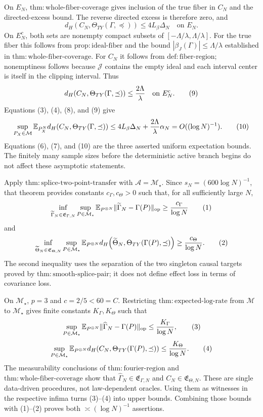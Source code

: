 On \(E_N\), \(\mathrm{thm:whole\text{-}fiber\text{-}coverage}\) gives inclusion of the true fiber in \(C_N\) and the directed-excess bound.  The reverse directed excess is therefore zero, and
\[
 d_H(C_N,\Theta_{TY}(\Gamma,\preceq))
 \le4L_\beta\Delta_N
 \quad\text{on }E_N. \tag{8}
\]
On \(E_N^c\), both sets are nonempty compact subsets of \([ -\Lambda/\lambda,\Lambda/\lambda]\).  For the true fiber this follows from \(\mathrm{prop:ideal\text{-}fiber}\) and the bound \(|\beta_J(\Gamma)|\le\Lambda/\lambda\) established in \(\mathrm{thm:whole\text{-}fiber\text{-}coverage}\).  For \(C_N\) it follows from \(\mathrm{def:fiber\text{-}region}\); nonemptiness follows because \(\mathcal J\) contains the empty ideal and each interval center is itself in the clipping interval.  Thus
\[
 d_H(C_N,\Theta_{TY}(\Gamma,\preceq))
 \le{2\Lambda\over\lambda}
 \quad\text{on }E_N^c. \tag{9}
\]
Equations (3), (4), (8), and (9) give
\[
 \sup_{P_X\in\mathcal M}\mathbb E_{P_X^N}
 d_H(C_N,\Theta_{TY}(\Gamma,\preceq))
 \le4L_\beta\Delta_N+{2\Lambda\over\lambda}\alpha_N
 =O((\log N)^{-1}). \tag{10}
\]
Equations (6), (7), and (10) are the three asserted uniform expectation bounds.  The finitely many sample sizes before the deterministic active branch begins do not affect these asymptotic statements.

Apply \(\mathrm{thm:splice\text{-}two\text{-}point\text{-}transfer}\) with \(\mathcal A=\mathcal M_\star\).  Since \(s_N=(600\log N)^{-1}\), that theorem provides constants \(c_\Gamma,c_\Theta>0\) such that, for all sufficiently large \(N\),
\[
 \inf_{\widetilde\Gamma_N\in\mathfrak E_{\Gamma,N}}
 \sup_{P\in\mathcal M_\star}
 \mathbb E_{P^{\otimes N}}\|\widetilde\Gamma_N-\Gamma(P)\|_{\mathrm{op}}
 \ge {c_\Gamma\over\log N} \tag{1}
\]
and
\[
 \inf_{\widetilde\Theta_N\in\mathfrak E_{\Theta,N}}
 \sup_{P\in\mathcal M_\star}
 \mathbb E_{P^{\otimes N}}
 d_H\!\left(\widetilde\Theta_N,
 \Theta_{TY}(\Gamma(P),\preceq)\right)
 \ge {c_\Theta\over\log N}. \tag{2}
\]
The second inequality uses the separation of the two singleton causal targets proved by \(\mathrm{thm:smooth\text{-}splice\text{-}pair}\); it does not define effect loss in terms of covariance loss.

On \(\mathcal M_\star\), \(p=3\) and \(c=2/5<60=C\).  Restricting \(\mathrm{thm:expected\text{-}log\text{-}rate}\) from \(\mathcal M\) to \(\mathcal M_\star\) gives finite constants \(K_\Gamma,K_\Theta\) such that
\[
 \sup_{P\in\mathcal M_\star}
 \mathbb E_{P^{\otimes N}}\|\widehat\Gamma_N-\Gamma(P)\|_{\mathrm{op}}
 \le {K_\Gamma\over\log N}, \tag{3}
\]
\[
 \sup_{P\in\mathcal M_\star}
 \mathbb E_{P^{\otimes N}}
 d_H(C_N,\Theta_{TY}(\Gamma(P),\preceq))
 \le {K_\Theta\over\log N}. \tag{4}
\]
The measurability conclusions of \(\mathrm{thm:fourier\text{-}region}\) and \(\mathrm{thm:whole\text{-}fiber\text{-}coverage}\) show that \(\widehat\Gamma_N\in\mathfrak E_{\Gamma,N}\) and \(C_N\in\mathfrak E_{\Theta,N}\).  These are single data-driven procedures, not law-dependent oracles.  Using them as witnesses in the respective infima turns (3)--(4) into upper bounds.  Combining those bounds with (1)--(2) proves both \(\asymp(\log N)^{-1}\) assertions.

